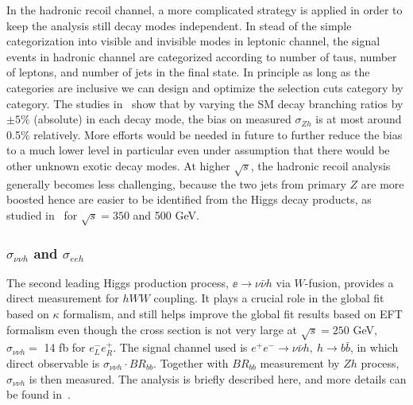 In the hadronic recoil channel, a more complicated strategy is applied in order to
keep the analysis still decay modes independent. In stead of the simple categorization
into visible and invisible modes in leptonic channel, the signal events in hadronic channel
are categorized according to number of taus, number of leptons, and number of jets
in the final state. In principle as long as the categories are inclusive we can design and 
optimize the selection cuts category by category. The studies in~\cite{Tomita:2015} show
that by varying the SM decay branching ratios by $\pm 5\%$ (absolute) in each decay mode,
the bias on measured $\sigma_{Zh}$ is at most around 0.5\% relatively.  
More efforts would be needed in future to further reduce the bias to a much lower level
in particular even under assumption that there would be other unknown exotic decay modes.
At higher $\sqrt{s}$, the hadronic recoil analysis generally becomes less challenging, because
the two jets from primary $Z$ are more boosted hence are easier to 
be identified from the Higgs decay products, as studied in~\cite{Thomson:2015jda,Miyamoto:2013zva}
for $\sqrt{s}=350$ and 500 GeV.

\subsubsection{$\sigma_{\nu\nu h}$ and $\sigma_{eeh}$}
\label{subsubsec:higgs:nunuee}

The second leading Higgs production process, 
$\ee\to\nu\bar{\nu}h$ via $W$-fusion, provides a direct measurement
for $hWW$ coupling. It plays a crucial role in the global fit based on $\kappa$ formalism,
and still helps improve the global fit results based on EFT formalism even though 
the cross section is not very large at $\sqrt{s}=250$ GeV, 
$\sigma_{\nu\nu h}=$ 14 fb for $e^-_Le^+_R$. 
The signal channel used is 
$e^+e^-\to\nu\bar{\nu}h,~h\to b\bar{b}$, in which direct observable is
$\sigma_{\nu\nu h}\cdot BR_{bb}$. Together with $BR_{bb}$ measurement
by $Zh$ process, $\sigma_{\nu\nu h}$ is then measured.
The analysis is briefly described here, and more details can be found 
in~\cite{Durig:2014lfa,Tian:2017}. 


